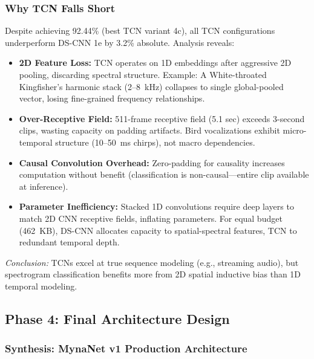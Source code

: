 \documentclass[conference]{IEEEtran}
\begin{document}
\subsubsection{Why TCN Falls Short}

Despite achieving 92.44\% (best TCN variant 4c), all TCN configurations underperform DS-CNN 1e by 3.2\% absolute. Analysis reveals:

\begin{itemize}
    \item \textbf{2D Feature Loss:} TCN operates on 1D embeddings after aggressive 2D pooling, discarding spectral structure. Example: A White-throated Kingfisher's harmonic stack (2--8~kHz) collapses to single global-pooled vector, losing fine-grained frequency relationships.

    \item \textbf{Over-Receptive Field:} 511-frame receptive field (5.1 sec) exceeds 3-second clips, wasting capacity on padding artifacts. Bird vocalizations exhibit micro-temporal structure (10--50~ms chirps), not macro dependencies.

    \item \textbf{Causal Convolution Overhead:} Zero-padding for causality increases computation without benefit (classification is non-causal—entire clip available at inference).

    \item \textbf{Parameter Inefficiency:} Stacked 1D convolutions require deep layers to match 2D CNN receptive fields, inflating parameters. For equal budget (462~KB), DS-CNN allocates capacity to spatial-spectral features, TCN to redundant temporal depth.
\end{itemize}

\noindent\textit{Conclusion:} TCNs excel at true sequence modeling (e.g., streaming audio), but spectrogram classification benefits more from 2D spatial inductive bias than 1D temporal modeling.

\subsection{Phase 4: Final Architecture Design}
\label{sec:phase4}

\subsubsection{Synthesis: MynaNet v1 Production Architecture}
\end{document}
